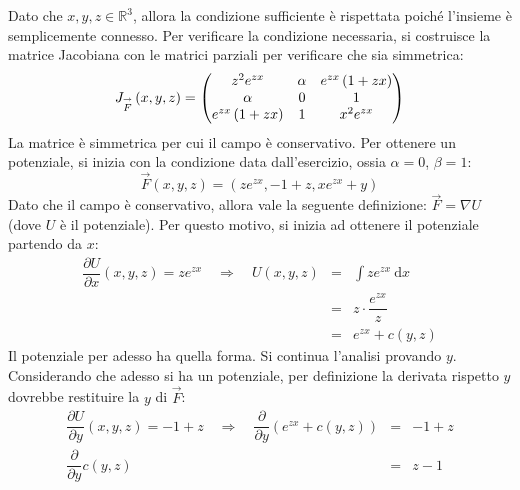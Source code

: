 \documentclass[a4paper]{article}
\makeatletter
\newenvironment{rowequmat}[1]{\left(\array{@{}#1@{}}}{\endarray\right)}
\makeatother
\begin{document}
	\noindent
	Dato che $x,y,z \in \mathbb{R}^{3}$, allora la condizione sufficiente è rispettata poiché l'insieme è semplicemente connesso. Per verificare la condizione necessaria, si costruisce la matrice Jacobiana con le matrici parziali per verificare che sia simmetrica:
	\begin{equation*}
		J_{\overset{\rightarrow}{F}}\left(x,y,z\right) = \begin{rowequmat}{c c c}
			z^{2}e^{zx} & \alpha & e^{zx}\left(1+zx\right) \\
			\alpha & 0 & 1 \\
			e^{zx}\left(1+zx\right) & 1 & x^{2}e^{zx}
		\end{rowequmat}
	\end{equation*}
	La matrice è simmetrica per cui il campo è conservativo. Per ottenere un potenziale, si inizia con la condizione data dall'esercizio, ossia $\alpha=0$, $\beta = 1$:
	\begin{equation*}
		\overset{\rightarrow}{F}\left(x,y,z\right) = \left(ze^{zx}, - 1 + z, xe^{zx}+y\right)
	\end{equation*}
	Dato che il campo è conservativo, allora vale la seguente definizione: $\overset{\rightarrow}{F} = \nabla U$ (dove $U$ è il potenziale). Per questo motivo, si inizia ad ottenere il potenziale partendo da $x$:
	\begin{equation*}
		\begin{array}{rcl}
			\dfrac{\partial U}{\partial x} \left(x,y,z\right) = ze^{zx} \hspace{1em} \Longrightarrow \hspace{1em} U\left(x,y,z\right) &=& \displaystyle\int ze^{zx} \:\mathrm{d}x \\ [1em]
			&=& z \cdot \dfrac{e^{zx}}{z} \\ [1em]
			&=& e^{zx} + c\left(y,z\right)
		\end{array}
	\end{equation*}
	Il potenziale per adesso ha quella forma. Si continua l'analisi provando $y$. Considerando che adesso si ha un potenziale, per definizione la derivata rispetto $y$ dovrebbe restituire la $y$ di $\overset{\rightarrow}{F}$:
	\begin{equation*}
		\begin{array}{rcl}
			\dfrac{\partial U}{\partial y}\left(x,y,z\right) = - 1 + z \hspace{1em}\Longrightarrow\hspace{1em} \dfrac{\partial}{\partial y}\left(e^{zx} + c\left(y,z\right)\right) &=& -1+z \\ [1em]
			\dfrac{\partial}{\partial y}c\left(y,z\right) &=& z-1
		\end{array}
	\end{equation*}
\end{document}
